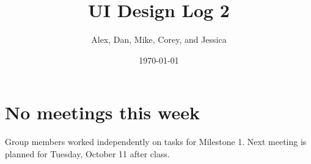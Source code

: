 \documentclass{article}
\title{UI Design Log 2}
\author{Alex, Dan, Mike, Corey, and Jessica}
\date{\today}
\begin{document}
\maketitle
\section{No meetings this week}
Group members worked independently on tasks for Milestone 1. Next meeting is
planned for Tuesday, October 11 after class.
\end{document}
